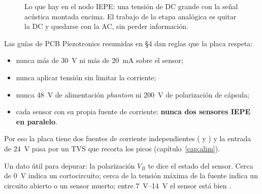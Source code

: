 \begin{figure}[htbp]
\centering
{}
\caption{Lo que hay en el nodo IEPE: una tensión de DC grande con la señal acústica montada encima. El trabajo de la etapa analógica es quitar la DC y quedarse con la AC, sin perder información.}
\label{fig:c01-onda}
\end{figure}

\begin{ojo}
Las guías de PCB Piezotronics resumidas en  §4 dan reglas que la placa respeta:
\begin{itemize}
  \item nunca más de \SI{30}{\volt} ni más de \SI{20}{\milli\ampere} sobre el sensor;
  \item nunca aplicar tensión sin limitar la corriente;
  \item nunca \SI{48}{\volt} de alimentación \emph{phantom} ni \SI{200}{\volt} de polarización de cápsula;
  \item cada sensor con su propia fuente de corriente: \textbf{nunca dos sensores IEPE en paralelo}.
\end{itemize}
Por eso la placa tiene dos fuentes de corriente independientes ( y ) y la entrada de \SI{24}{\volt} pasa por un TVS que recorta los picos (capítulo~\ref{cap:alim}).
\end{ojo}

Un dato útil para depurar: la polarización $V_B$ te dice el estado del sensor. Cerca de \SI{0}{\volt} indica un cortocircuito; cerca de la tensión máxima de la fuente indica un circuito abierto o un sensor muerto; entre \SIrange{7}{14}{\volt} el sensor está bien .

